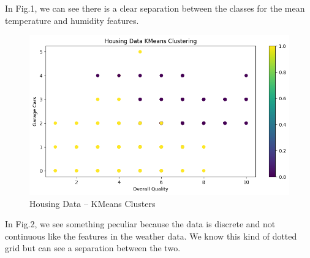 \documentclass[conference]{IEEEtran}
\begin{document}
\par In Fig.1, we can see there is a clear separation between the classes for the mean temperature and humidity features. 
\begin{figure}
    \centering
    \includegraphics[width=1.0\linewidth]{figures//housing_figures/step_1c.png}
    \caption{Housing Data -- KMeans Clusters}
    \label{fig:2_housing_kmeans
}
\end{figure}
\par In Fig.2, we see something peculiar because the data is discrete and not continuous like the features in the weather data. We know this kind of dotted grid but can see a separation between the two.
\end{document}
